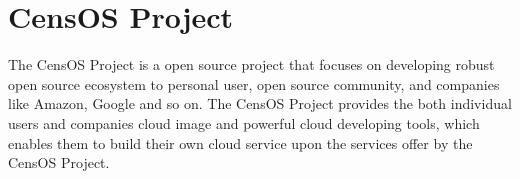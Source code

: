 \section{CensOS Project}

The CensOS Project is a open source project that focuses on developing robust open source ecosystem to personal user, open source community, and companies like Amazon, Google and so on. The CensOS Project provides the both individual users and companies cloud image and powerful cloud developing tools, which enables them to build their own cloud service upon the services offer by the CensOS Project\cite{centOS}.
